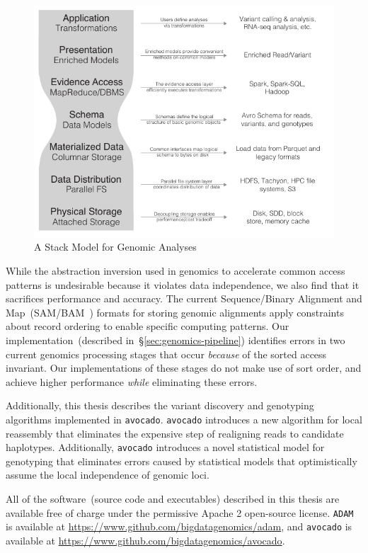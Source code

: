 \documentclass[masters]{ucbthesis}
\begin{document}
\begin{figure}[h]
\begin{center}
\includegraphics[width=0.75\linewidth]{expanded-stack-2.pdf}
\end{center}
\caption{A Stack Model for Genomic Analyses}
\label{fig:stack-model}
\end{figure}

While the abstraction inversion used in genomics to accelerate common access patterns is undesirable
because it violates data independence, we also find that it sacrifices performance and
accuracy. The current Sequence/Binary Alignment and Map~(SAM/BAM~\cite{li09}) formats for storing
genomic alignments apply constraints about record ordering to enable specific computing patterns. Our
implementation~(described in~\S\ref{sec:genomics-pipeline}) identifies errors in two current genomics
processing stages that occur \emph{because} of the sorted access invariant. Our implementations of
these stages do not make use of sort order, and achieve higher performance \emph{while} eliminating
these errors.

Additionally, this thesis describes the variant discovery and genotyping algorithms implemented in
\texttt{avocado}. \texttt{avocado} introduces a new algorithm for local reassembly that eliminates the
expensive step of realigning reads to candidate haplotypes. Additionally, \texttt{avocado} introduces
a novel statistical model for genotyping that eliminates errors caused by statistical models that
optimistically assume the local independence of genomic loci.

All of the software~(source code and executables) described in this thesis are available free of charge
under the permissive Apache 2 open-source license. \texttt{ADAM} is available at
\url{https://www.github.com/bigdatagenomics/adam}, and \texttt{avocado} is available at
\url{https://www.github.com/bigdatagenomics/avocado}.
\end{document}
